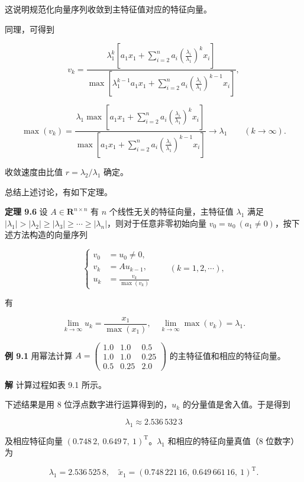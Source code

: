 这说明规范化向量序列收敛到主特征值对应的特征向量。

同理，可得到

\[
v_k=\frac{\lambda_1^k\left[a_1x_1+\displaystyle\sum_{i=2}^na_i\left(\frac{\lambda_i}{\lambda_1}\right)^kx_i\right]}{\max\left[\lambda_1^{k-1}a_1x_1+\displaystyle\sum_{i=2}^na_i\left(\frac{\lambda_i}{\lambda_1}\right)^{k-1}x_i\right]},
\]

\[
\max(v_k)=\frac{\lambda_1\max\left[a_1x_1+\displaystyle\sum_{i=2}^na_i\left(\frac{\lambda_i}{\lambda_1}\right)^kx_i\right]}{\max\left[a_1x_1+\displaystyle\sum_{i=2}^na_i\left(\frac{\lambda_i}{\lambda_1}\right)^{k-1}x_i\right]}\to\lambda_1\qquad(k\to\infty).
\]

收敛速度由比值 \(r=\lambda_2/\lambda_1\) 确定。

总结上述讨论，有如下定理。

\textbf{定理 9.6} 设 \(A\in\mathbf R^{n\times n}\) 有 \(n\) 个线性无关的特征向量，主特征值 \(\lambda_1\) 满足 \(|\lambda_1|>|\lambda_2|\geq|\lambda_3|\geq\cdots\geq|\lambda_n|\)，则对于任意非零初始向量 \(v_0=u_0\ (a_1\ne0)\)，按下述方法构造的向量序列

\[
\left\{
\begin{aligned}
v_0&=u_0\ne0,\\
v_k&=Au_{k-1},\\
u_k&=\frac{v_k}{\max(v_k)}
\end{aligned}
\right.\qquad(k=1,2,\cdots),
\tag{9.2.9}
\]

有

\[
\lim_{k\to\infty}u_k=\frac{x_1}{\max(x_1)},\quad\lim_{k\to\infty}\max(v_k)=\lambda_1.
\]

\textbf{例 9.1} 用幂法计算 \(A=\begin{pmatrix}1.0&1.0&0.5\\1.0&1.0&0.25\\0.5&0.25&2.0\end{pmatrix}\) 的主特征值和相应的特征向量。

\textbf{解} 计算过程如表 9.1 所示。

下述结果是用 8 位浮点数字进行运算得到的，\(u_k\) 的分量值是舍入值。于是得到

\[
\lambda_1\approx2.536\,532\,3
\]

及相应特征向量 \((0.748\,2,\ 0.649\,7,\ 1)^{\mathrm T}\)。\(\lambda_1\) 和相应的特征向量真值（8 位数字）为

\[
\lambda_1=2.536\,525\,8,\quad\widetilde{x}_1=(0.748\,221\,16,\ 0.649\,661\,16,\ 1)^{\mathrm T}.
\]

